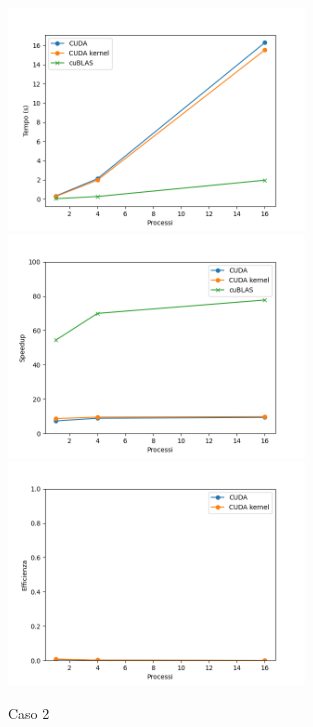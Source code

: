\begin{figure}[ht]
    \centering
    \includegraphics[width=0.7\textwidth]{./imgs/graphs/caso_b.png}
    \includegraphics[width=0.7\textwidth]{./imgs/graphs/caso_b_speedup.png}
    \includegraphics[width=0.7\textwidth]{./imgs/graphs/caso_b_efficiency.png}
    \caption{Caso 2}
\end{figure}

